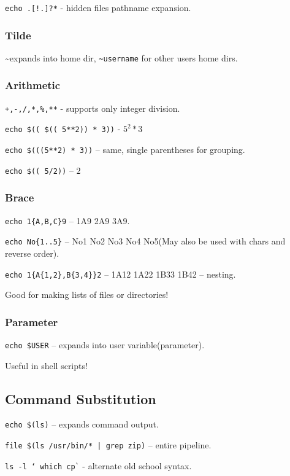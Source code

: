 \documentclass[8pt]{extarticle}
\begin{document}
\begin{multicols}{2}
\texttt{echo .[!.]?*} - hidden files pathname expansion.

\subsubsection{Tilde}

\textasciitilde expands into home dir, \texttt{\textasciitilde username} for other users home dirs.

\subsubsection{Arithmetic}

\texttt{+,-,/,*,\%,**} - supports only integer division.

\texttt{echo \$(( \$(( 5**2)) * 3))} - $5^{2}*3$

\texttt{echo \$(((5**2) * 3))} – same, single parentheses for grouping.

\texttt{echo \$(( 5/2))} – $2$

\subsubsection{Brace}

\texttt{echo 1\{A,B,C\}9} – 1A9 2A9 3A9.

\texttt{echo No\{1..5\}} – No1 No2 No3 No4 No5(May also be used with chars and reverse order).

\texttt{echo 1\{A\{1,2\},B\{3,4\}\}2} – 1A12 1A22 1B33 1B42 – nesting.

Good for making lists of files or directories!

\subsubsection{Parameter}

\texttt{echo \$USER} – expands into user variable(parameter).

Useful in shell scripts!

\subsection{Command Substitution}

\texttt{echo \$(ls)} – expands command output.

\texttt{file \$(ls /usr/bin/* | grep zip)} – entire pipeline.

\texttt{ls -l `  which cp\`} - alternate old school syntax.


\end{multicols}
\end{document}
